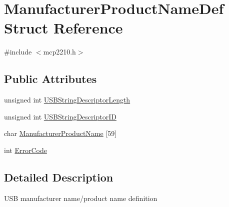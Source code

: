 \hypertarget{struct_manufacturer_product_name_def}{\section{\-Manufacturer\-Product\-Name\-Def \-Struct \-Reference}
\label{struct_manufacturer_product_name_def}
}


{\ttfamily \#include $<$mcp2210.\-h$>$}

\subsection*{\-Public \-Attributes}
\begin{DoxyCompactItemize}
\item 
unsigned int \hyperlink{struct_manufacturer_product_name_def_a78178464ccb77610a03691701cca017e}{\-U\-S\-B\-String\-Descriptor\-Length}
\item 
unsigned int \hyperlink{struct_manufacturer_product_name_def_a338f0d675fb05fabd7654239ca9b878d}{\-U\-S\-B\-String\-Descriptor\-I\-D}
\item 
char \hyperlink{struct_manufacturer_product_name_def_ae0bc4c8cdce9488bdb26da7850e7fe84}{\-Manufacturer\-Product\-Name} \mbox{[}59\mbox{]}
\item 
int \hyperlink{struct_manufacturer_product_name_def_a826000ba27e897acf51b987c78d62861}{\-Error\-Code}
\end{DoxyCompactItemize}


\subsection{\-Detailed \-Description}
\-U\-S\-B manufacturer name/product name definition 

